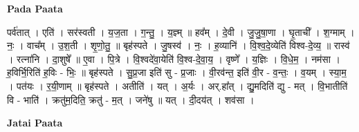 \documentclass[17pt]{extarticle}
\begin{document}
\textbf{Pada Paata} \newline

पर्व॑तात् । एति॑ । सर॑स्वती । य॒ज॒ता । ग॒न्तु॒ । य॒ज्ञ्म् ॥ हव᳚म् । दे॒वी । जु॒जु॒षा॒णा । घृ॒ताची᳚ । श॒ग्माम् । नः॒ । वाच᳚म् । उ॒श॒ती । शृ॒णो॒तु॒ ॥ बृह॑स्पते । जु॒षस्व॑ । नः॒ । ह॒व्यानि॑ । वि॒श्व॒दे॒व्येति॑ विश्व-दे॒व्य॒ ॥ रास्व॑ । रत्ना॑नि । दा॒शुषे᳚ ॥ ए॒वा । पि॒त्रे । वि॒श्वदे॑वा॒येति॑ वि॒श्व-दे॒वा॒य॒ । वृष्णे᳚ । य॒ज्ञिः । वि॒धे॒म॒ । नम॑सा । ह॒विर्भि॒रिति॑ ह॒विः - भिः॒ ॥ बृह॑स्पते । सु॒प्र॒जा इति॑ सु - प्र॒जाः । वी॒रव॑न्त॒ इति॑ वी॒र - व॒न्तः॒ । व॒यम् । स्या॒म॒ । पत॑यः । र॒यी॒णाम् ॥ बृह॑स्पते । अतीति॑ । यत् । अ॒र्यः । अर्.हा᳚त् । द्यु॒मदिति॑ द्यु - मत् । वि॒भातीति॑ वि - भाति॑ । क्रतु॑म॒दिति॒ क्रतु॑ - म॒त् । जने॑षु ॥ यत् । दी॒दय॑त् । शव॑सा ।  \newline



\textbf{Jatai Paata} \newline
\end{document}
